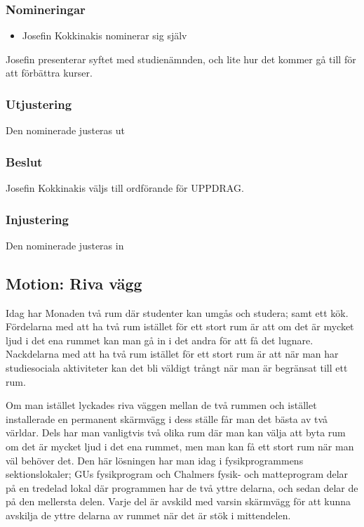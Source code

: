 \documentclass[protokoll]{dvd}
\begin{document}
    \subsubsection*{Nomineringar}

        \begin{itemize}
            \item Josefin Kokkinakis nominerar sig själv
        \end{itemize}

        Josefin presenterar syftet med studienämnden, och lite hur det kommer gå till för att förbättra kurser.

        \subsubsection*{Utjustering}
        Den nominerade justeras ut

        \subsubsection*{Beslut}
            \begin{attsatser}
                \item Josefin Kokkinakis väljs till ordförande för UPPDRAG.
            \end{attsatser}

        \subsubsection*{Injustering}
        Den nominerade justeras in

\subsection{Motion: Riva vägg}

Idag har Monaden två rum där studenter kan umgås och studera; samt ett kök.
Fördelarna med att ha två rum istället för ett stort rum är att om det är mycket ljud i det ena rummet kan man gå in i det andra för att få det lugnare.
Nackdelarna med att ha två rum istället för ett stort rum är att när man har studiesociala aktiviteter kan det bli väldigt trångt när man är begränsat till ett rum.

Om man istället lyckades riva väggen mellan de två rummen och istället installerade en permanent skärmvägg i dess ställe får man det bästa av två världar.
Dels har man vanligtvis två olika rum där man kan välja att byta rum om det är mycket ljud i det ena rummet, men man kan få ett stort rum när man väl behöver det.
Den här lösningen har man idag i fysikprogrammens sektionslokaler; GUs fysikprogram och Chalmers fysik- och matteprogram delar på en tredelad lokal där programmen har de två yttre delarna, och sedan delar de på den mellersta delen.
Varje del är avskild med varsin skärmvägg för att kunna avskilja de yttre delarna av rummet när det är stök i mittendelen.
\end{document}
